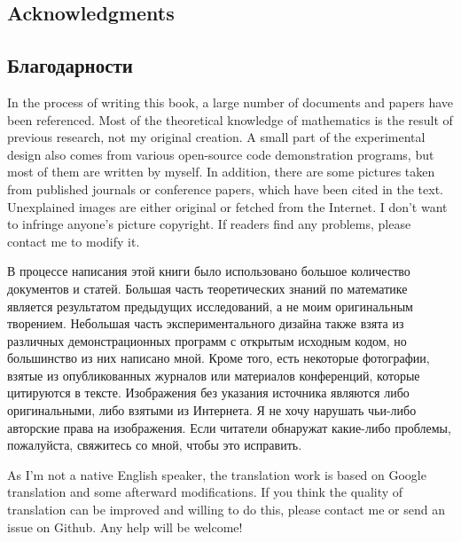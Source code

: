 \begin{English}
    \chapter*{Acknowledgments}
\end{English}

\begin{Russian}
    \chapter*{Благодарности}
\end{Russian}

\begin{English}
    In the process of writing this book, a large number of documents and papers have been referenced. Most of the theoretical knowledge of mathematics is the result of previous research, not my original creation. A small part of the experimental design also comes from various open-source code demonstration programs, but most of them are written by myself. In addition, there are some pictures taken from published journals or conference papers, which have been cited in the text. Unexplained images are either original or fetched from the Internet. I don’t want to infringe anyone’s picture copyright. If readers find any problems, please contact me to modify it.
\end{English}

\begin{Russian}
    В процессе написания этой книги было использовано большое количество документов и статей. Большая часть теоретических знаний по математике является результатом предыдущих исследований, а не моим оригинальным творением. Небольшая часть экспериментального дизайна также взята из различных демонстрационных программ с открытым исходным кодом, но большинство из них написано мной. Кроме того, есть некоторые фотографии, взятые из опубликованных журналов или материалов конференций, которые цитируются в тексте. Изображения без указания источника являются либо оригинальными, либо взятыми из Интернета. Я не хочу нарушать чьи-либо авторские права на изображения. Если читатели обнаружат какие-либо проблемы, пожалуйста, свяжитесь со мной, чтобы это исправить.
\end{Russian}

\begin{English}
    As I'm not a native English speaker, the translation work is based on Google translation and some afterward modifications. If you think the quality of translation can be improved and willing to do this, please contact me or send an issue on Github. Any help will be welcome!
\end{English}

